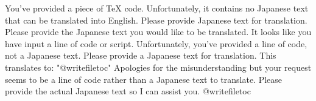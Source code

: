 \relax
\providecommand\hyper@newdestlabel[2]{}
You've provided a piece of TeX code. Unfortunately, it contains no Japanese text that can be translated into English. Please provide Japanese text for translation.
Please provide the Japanese text you would like to be translated. It looks like you have input a line of code or script.
Unfortunately, you've provided a line of code, not a Japanese text. Please provide a Japanese text for translation.
This translates to: "@writefile{toc}{\protected@file@percent }"
Apologies for the misunderstanding but your request seems to be a line of code rather than a Japanese text to translate. Please provide the actual Japanese text so I can assist you.
@writefile{toc}{\protected@file@percent }
